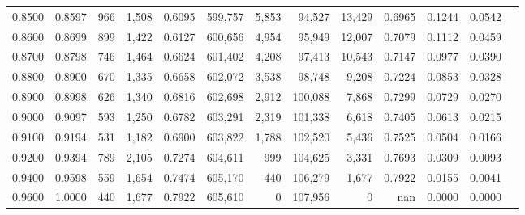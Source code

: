 \begin{tabular}{rrrrrrrrrrrrr}
0.8500 & 0.8597 &    966 & 1,508 &                                     0.6095 & 599,757 &   5,853 &  94,527 &  13,429 & 0.6965 & 0.1244 & 0.0542 \\
0.8600 & 0.8699 &    899 & 1,422 &                                     0.6127 & 600,656 &   4,954 &  95,949 &  12,007 & 0.7079 & 0.1112 & 0.0459 \\
0.8700 & 0.8798 &    746 & 1,464 &                                     0.6624 & 601,402 &   4,208 &  97,413 &  10,543 & 0.7147 & 0.0977 & 0.0390 \\
0.8800 & 0.8900 &    670 & 1,335 &                                     0.6658 & 602,072 &   3,538 &  98,748 &   9,208 & 0.7224 & 0.0853 & 0.0328 \\
0.8900 & 0.8998 &    626 & 1,340 &                                     0.6816 & 602,698 &   2,912 & 100,088 &   7,868 & 0.7299 & 0.0729 & 0.0270 \\
0.9000 & 0.9097 &    593 & 1,250 &                                     0.6782 & 603,291 &   2,319 & 101,338 &   6,618 & 0.7405 & 0.0613 & 0.0215 \\
0.9100 & 0.9194 &    531 & 1,182 &                                     0.6900 & 603,822 &   1,788 & 102,520 &   5,436 & 0.7525 & 0.0504 & 0.0166 \\
0.9200 & 0.9394 &    789 & 2,105 &                                     0.7274 & 604,611 &     999 & 104,625 &   3,331 & 0.7693 & 0.0309 & 0.0093 \\
0.9400 & 0.9598 &    559 & 1,654 &                                     0.7474 & 605,170 &     440 & 106,279 &   1,677 & 0.7922 & 0.0155 & 0.0041 \\
0.9600 & 1.0000 &    440 & 1,677 &                                     0.7922 & 605,610 &       0 & 107,956 &       0 &    nan & 0.0000 & 0.0000 \\
\bottomrule
\end{tabular}
